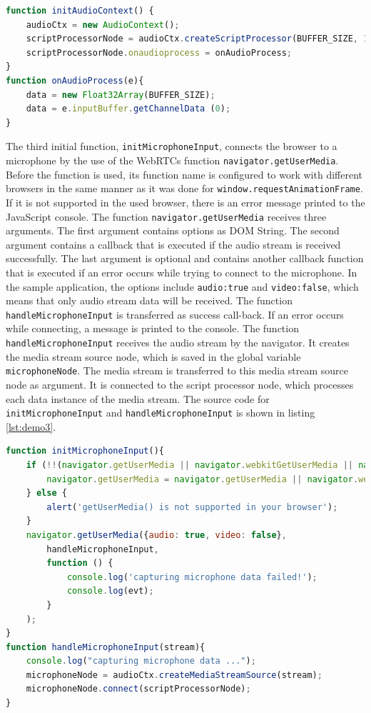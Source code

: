 \begin{lstlisting}[caption={Web Audio Demo: Initialize audio context.},label={lst:demo2}, language=JavaScript]
function initAudioContext() {
    audioCtx = new AudioContext();   
    scriptProcessorNode = audioCtx.createScriptProcessor(BUFFER_SIZE, 1, 1); 
    scriptProcessorNode.onaudioprocess = onAudioProcess;
}
function onAudioProcess(e){
    data = new Float32Array(BUFFER_SIZE);
    data = e.inputBuffer.getChannelData (0);
}
\end{lstlisting}

The third initial function, \lstinline{initMicrophoneInput}, connects the browser to a microphone by the use of the WebRTCs function \lstinline{navigator.getUserMedia}. Before the function is used, its function name is configured to work with different browsers in the same manner as it was done for \lstinline{window.requestAnimationFrame}. If it is not supported in the used browser, there is an error message printed to the JavaScript console. The function \lstinline{navigator.getUserMedia} receives three arguments. The first argument contains options as DOM String. The second argument contains a callback that is executed if the audio stream is received successfully. The last argument is optional and contains another callback function that is executed if an error occurs while trying to connect to the microphone. In the sample application, the options include \lstinline{audio:true} and \lstinline{video:false}, which means that only audio stream data will be received. The function \lstinline{handleMicrophoneInput} is transferred as success call-back. If an error occurs while connecting, a message is printed to the console. The function \lstinline{handleMicrophoneInput} receives the audio stream by the navigator. It creates the media stream source node, which is saved in the global variable \lstinline{microphoneNode}. The media stream is transferred to this media stream source node as argument. It is connected to the script processor node, which processes each data instance of the media stream. The source code for \lstinline{initMicrophoneInput} and \lstinline{handleMicrophoneInput} is shown in listing \ref{lst:demo3}.

\begin{lstlisting}[caption={Web Audio Demo: Initialize microphone input.},label={lst:demo3}, language=JavaScript]
function initMicrophoneInput(){
    if (!!(navigator.getUserMedia || navigator.webkitGetUserMedia || navigator.mozGetUserMedia || navigator.msGetUserMedia)) {      
        navigator.getUserMedia = navigator.getUserMedia || navigator.webkitGetUserMedia || navigator.mozGetUserMedia || navigator.msGetUserMedia;
    } else {
        alert('getUserMedia() is not supported in your browser');        
    }
    navigator.getUserMedia({audio: true, video: false}, 
        handleMicrophoneInput, 
        function () {
            console.log('capturing microphone data failed!');
            console.log(evt);
        }
    );
}
function handleMicrophoneInput(stream){
    console.log("capturing microphone data ...");
    microphoneNode = audioCtx.createMediaStreamSource(stream);
    microphoneNode.connect(scriptProcessorNode);   
}
\end{lstlisting}


